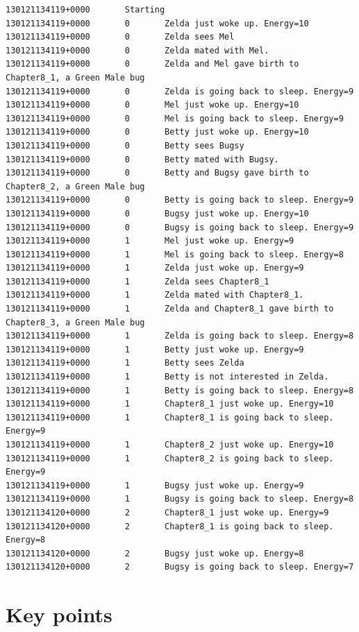 \documentclass[a4paper,10pt]{report}
\begin{document}
\begin{verbatim}
130121134119+0000       Starting
130121134119+0000       0       Zelda just woke up. Energy=10
130121134119+0000       0       Zelda sees Mel
130121134119+0000       0       Zelda mated with Mel.
130121134119+0000       0       Zelda and Mel gave birth to Chapter8_1, a Green Male bug
130121134119+0000       0       Zelda is going back to sleep. Energy=9
130121134119+0000       0       Mel just woke up. Energy=10
130121134119+0000       0       Mel is going back to sleep. Energy=9
130121134119+0000       0       Betty just woke up. Energy=10
130121134119+0000       0       Betty sees Bugsy
130121134119+0000       0       Betty mated with Bugsy.
130121134119+0000       0       Betty and Bugsy gave birth to Chapter8_2, a Green Male bug
130121134119+0000       0       Betty is going back to sleep. Energy=9
130121134119+0000       0       Bugsy just woke up. Energy=10
130121134119+0000       0       Bugsy is going back to sleep. Energy=9
130121134119+0000       1       Mel just woke up. Energy=9
130121134119+0000       1       Mel is going back to sleep. Energy=8
130121134119+0000       1       Zelda just woke up. Energy=9
130121134119+0000       1       Zelda sees Chapter8_1
130121134119+0000       1       Zelda mated with Chapter8_1.
130121134119+0000       1       Zelda and Chapter8_1 gave birth to Chapter8_3, a Green Male bug
130121134119+0000       1       Zelda is going back to sleep. Energy=8
130121134119+0000       1       Betty just woke up. Energy=9
130121134119+0000       1       Betty sees Zelda
130121134119+0000       1       Betty is not interested in Zelda.
130121134119+0000       1       Betty is going back to sleep. Energy=8
130121134119+0000       1       Chapter8_1 just woke up. Energy=10
130121134119+0000       1       Chapter8_1 is going back to sleep. Energy=9
130121134119+0000       1       Chapter8_2 just woke up. Energy=10
130121134119+0000       1       Chapter8_2 is going back to sleep. Energy=9
130121134119+0000       1       Bugsy just woke up. Energy=9
130121134119+0000       1       Bugsy is going back to sleep. Energy=8
130121134120+0000       2       Chapter8_1 just woke up. Energy=9
130121134120+0000       2       Chapter8_1 is going back to sleep. Energy=8
130121134120+0000       2       Bugsy just woke up. Energy=8
130121134120+0000       2       Bugsy is going back to sleep. Energy=7
\end{verbatim}

\section{Key points}
\end{document}
